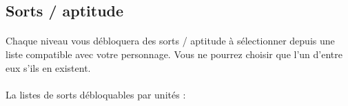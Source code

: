 \subsection{Sorts / aptitude}

\paragraph{} Chaque niveau vous débloquera des sorts / aptitude à sélectionner depuis une liste compatible avec votre personnage. Vous ne pourrez choisir que l'un d'entre eux s'ils en existent.

\paragraph{} La listes de sorts débloquables par unités :
